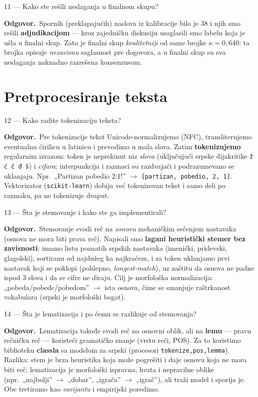 \documentclass[11pt,a4paper]{article}
\newcommand{\kod}[1]{\texttt{#1}}
\newcommand{\odg}{\smallskip\noindent\textbf{Odgovor.}\ }
\begin{document}
\begin{pitanje}{11 --- Kako ste rešili neslaganja u finalnom skupu?}
\end{pitanje}
\odg Spornih (preklapajućih) naslova iz kalibracije bilo je 38 i njih smo rešili
\textbf{adjudikacijom} --- kroz zajedničku diskusiju usaglasili smo labelu koja je
ušla u finalni skup. Zato je finalni skup \emph{kvalitetniji} od same brojke
$\kappa=0{,}640$: ta brojka opisuje \emph{nezavisnu} saglasnost pre dogovora, a u
finalni skup su sva neslaganja naknadno razrešena konsenzusom.

\section{Pretprocesiranje teksta}

\begin{pitanje}{12 --- Kako radite tokenizaciju teksta?}
\end{pitanje}
\odg Pre tokenizacije tekst Unicode-normalizujemo (NFC), transliterujemo eventualnu
ćirilicu u latinicu i prevodimo u mala slova. Zatim \textbf{tokenizujemo} regularnim
izrazom: token je neprekinut niz \emph{slova} (uključujući srpske dijakritike
\kod{ž ć č đ š}) i \emph{cifara}; interpunkcija i razmaci su razdvajači i podrazumevano
se uklanjaju. Npr.\ „Partizan pobedio 2:1!'' $\to$
\kod{[partizan, pobedio, 2, 1]}. Vektorizator (\kod{scikit-learn}) dobija već
tokenizovan tekst i samo deli po razmaku, pa ne tokenizuje dvaput.

\begin{pitanje}{13 --- Šta je stemovanje i kako ste ga implementirali?}
\end{pitanje}
\odg Stemovanje svodi reč na \emph{osnovu} mehaničkim sečenjem nastavaka (osnova ne
mora biti prava reč). Napisali smo \textbf{lagani heuristički stemer bez zavisnosti}:
imamo listu poznatih srpskih nastavaka (imenički, pridevski, glagolski), sortiranu od
najdužeg ka najkraćem, i za token uklanjamo prvi nastavak koji se poklopi
(pohlepno, \emph{longest-match}), uz zaštitu da osnova ne padne ispod 3 slova i da se
cifre ne diraju. Cilj je morfološka normalizacija: „pobeda/pobede/pobedom'' $\to$
ista osnova, čime se smanjuje raštrkanost vokabulara (srpski je morfološki bogat).

\begin{pitanje}{14 --- Šta je lematizacija i po čemu se razlikuje od stemovanja?}
\end{pitanje}
\odg Lematizacija takođe svodi reč na osnovni oblik, ali na \textbf{lemu} --- pravu
rečničku reč --- koristeći gramatičko znanje (vrstu reči, POS). Za to koristimo
biblioteku \textbf{classla} sa modelom za srpski (procesori \kod{tokenize,pos,lemma}).
Razlika: stem je brza heuristika koja može pogrešiti i daje osnovu koja ne mora biti
reč; lematizacija je morfološki ispravna, hvata i nepravilne oblike (npr.\ „najbolji''
$\to$ „dobar'', „igrača'' $\to$ „igrač''), ali traži model i sporija je. Obe tretiramo
kao \emph{varijantu} i empirijski poredimo.
\end{document}
